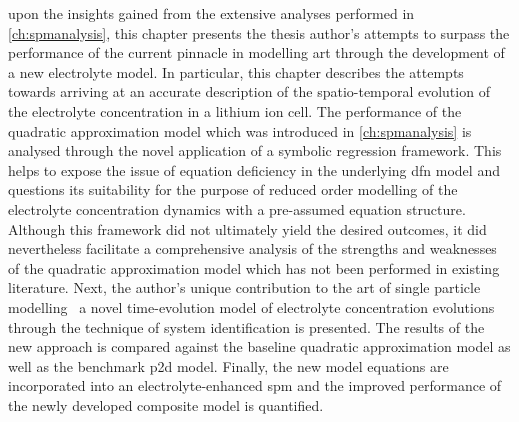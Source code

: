 
  upon  the insights  gained  from  the extensive  analyses
performed in  \cref{ch:spmanalysis}, this  chapter presents the  thesis author's
attempts to  surpass the performance  of the  current pinnacle in  modelling art
through the development of a new  electrolyte model. In particular, this chapter
describes  the attempts  towards  arriving  at an  accurate  description of  the
spatio-temporal  evolution of  the electrolyte  concentration in  a lithium  ion
cell. The performance of the  quadratic approximation model which was introduced
in \cref{ch:spmanalysis} is analysed through the novel application of a symbolic
regression framework. This  helps to expose the issue of  equation deficiency in
the underlying \gls{dfn} model and questions  its suitability for the purpose of
reduced  order  modelling  of  the electrolyte  concentration  dynamics  with  a
pre-assumed equation structure. Although this framework did not ultimately yield
the desired outcomes, it did nevertheless facilitate a comprehensive analysis of
the  strengths  and  weaknesses  of  the  quadratic  approximation  model  which
has  not  been performed  in  existing  literature.  Next, the  author's  unique
contribution to the art of single particle modelling \viz~a novel time-evolution
model of  electrolyte concentration evolutions  through the technique  of system
identification  is  presented. The  results  of  the  new approach  is  compared
against  the baseline  quadratic approximation  model as  well as  the benchmark
\gls{p2d}  model. Finally,  the new  model  equations are  incorporated into  an
electrolyte-enhanced  \gls{spm}  and  the  improved  performance  of  the  newly
developed composite model is quantified.

